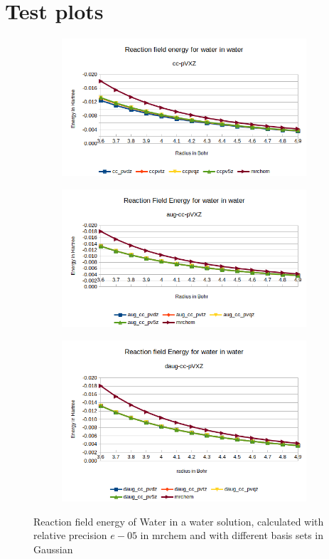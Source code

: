 \documentclass[../master_thesis.tex]{subfiles}
\begin{document}
\chapter{Test plots}
\begin{figure}[hb!]
  \centering
  \begin{subfigure}[b]{0.75\linewidth}
    \includegraphics[width=\linewidth]{img/Erwat.png}
  \end{subfigure}
  \begin{subfigure}[b]{0.75\linewidth}
    \includegraphics[width=\linewidth]{img/Eraugwat.png}
  \end{subfigure}
  \begin{subfigure}[b]{0.75\linewidth}
    \includegraphics[width=\linewidth]{img/Erdaugwat.png}
  \end{subfigure}
  \caption{Reaction field energy of Water in a water solution, calculated with relative precision $e-05$ in mrchem
  and with different basis sets in Gaussian}
  \label{fig:watEnergyplots}
\end{figure}
\end{document}
